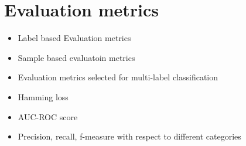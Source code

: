 \section{Evaluation metrics}\label{evaluation_metrics}

\cite{zhang2013review}
    \begin{itemize}
        \item Label based Evaluation metrics
        \item Sample based evaluatoin metrics
        \item Evaluation metrics selected for multi-label classification 
        \item Hamming loss 
        \item AUC-ROC score 
        \item Precision, recall, f-measure with respect to different categories
    \end{itemize}
    
    
